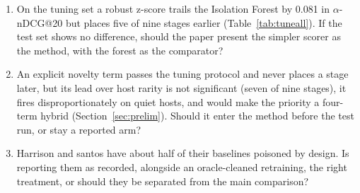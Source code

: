 \documentclass[conference]{IEEEtran}
\begin{document}
\begin{enumerate}
\item On the tuning set a robust z-score trails the Isolation Forest by 0.081 in $\alpha$-nDCG@20 but places five of nine stages earlier (Table~\ref{tab:tuneall}). If the test set shows no difference, should the paper present the simpler scorer as the method, with the forest as the comparator?
\item An explicit novelty term passes the tuning protocol and never places a stage later, but its lead over host rarity is not significant (seven of nine stages), it fires disproportionately on quiet hosts, and would make the priority a four-term hybrid (Section~\ref{sec:prelim}). Should it enter the method before the test run, or stay a reported arm?
\item Harrison and santos have about half of their baselines poisoned by design. Is reporting them as recorded, alongside an oracle-cleaned retraining, the right treatment, or should they be separated from the main comparison?
\end{enumerate}
\end{document}
